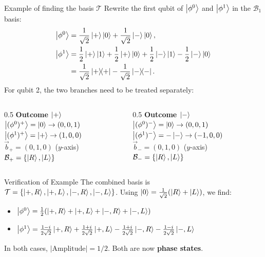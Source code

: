 \begin{frame}{Example of finding the basis $\mathcal{T}$}
    Rewrite the first qubit of $\ket{\phi^0}$ and $\ket{\phi^1}$ in the $\mathcal{B}_1$ basis:
    \begin{align*}
        \ket{\phi^0} &= \frac{1}{\sqrt{2}}\ket{+}\ket{0} + \frac{1}{\sqrt{2}}\ket{-}\ket{0}, \\
        \ket{\phi^1} &= \frac{1}{2}\ket{+}\ket{1} + \frac{1}{2}\ket{+}\ket{0} + \frac{1}{2}\ket{-}\ket{1} - \frac{1}{2}\ket{-}\ket{0} \\ 
        &= \frac{1}{\sqrt{2}}\ketbra{+}{+} - \frac{1}{\sqrt{2}} \ketbra{-}{-}.
    \end{align*}
    For qubit 2, the two branches need to be treated separately:
    \vspace{0.8em}
    \begin{columns}
        \begin{column}{0.5\textwidth}
            \centering \textbf{Outcome $\ket{+}$} \\
            $\ket{(\phi^0)^+} = \ket{0} \to (0,0,1)$ \\
            $\ket{(\phi^1)^+} = \ket{+} \to (1,0,0)$ \\
            $\vec{b}_+ = (0,1,0)$ ($y$-axis) \\
            $\mathcal{B}_+ = \{\ket{R}, \ket{L}\}$
        \end{column}
        \begin{column}{0.5\textwidth}
            \centering \textbf{Outcome $\ket{-}$} \\
            $\ket{(\phi^0)^-} = \ket{0} \to (0,0,1)$ \\
            $\ket{(\phi^1)^-} = -\ket{-} \to (-1,0,0)$ \\
            $\vec{b}_- = (0,1,0)$ ($y$-axis) \\
            $\mathcal{B}_- = \{\ket{R}, \ket{L}\}$
        \end{column}
    \end{columns}
\end{frame}

\begin{frame}{Verification of Example}
    The combined basis is $\mathcal{T} = \{\ket{+,R}, \ket{+,L}, \ket{-,R}, \ket{-,L}\}$. 
    Using $\ket{0} = \frac{1}{\sqrt{2}}(\ket{R} + \ket{L})$, we find:
    \vspace{0.3cm}
    \begin{itemize}
        \item $\ket{\phi^0} = \frac{1}{2}(\ket{+,R} + \ket{+,L} + \ket{-,R} + \ket{-,L})$
        \item $\ket{\phi^1} = \frac{1-i}{2\sqrt{2}}\ket{+,R} + \frac{1+i}{2\sqrt{2}}\ket{+,L} - \frac{1+i}{2\sqrt{2}}\ket{-,R} - \frac{1-i}{2\sqrt{2}}\ket{-,L}$
    \end{itemize}
    \vspace{0.3cm}
    In both cases, $|\text{Amplitude}| = 1/2$. Both are now \textbf{phase states}.
\end{frame}
